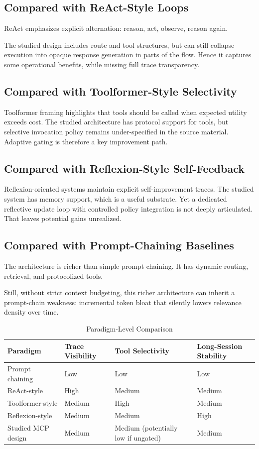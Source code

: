 \documentclass[conference]{IEEEtran}
\begin{document}
\subsection{Compared with ReAct-Style Loops}

ReAct emphasizes explicit alternation:
reason,
act,
observe,
reason again.

The studied design includes route and tool structures,
but can still collapse execution into opaque response generation in parts of the flow.
Hence it captures some operational benefits,
while missing full trace transparency.

\subsection{Compared with Toolformer-Style Selectivity}

Toolformer framing highlights that tools should be called when expected utility exceeds cost.
The studied architecture has protocol support for tools,
but selective invocation policy remains under-specified in the source material.
Adaptive gating is therefore a key improvement path.

\subsection{Compared with Reflexion-Style Self-Feedback}

Reflexion-oriented systems maintain explicit self-improvement traces.
The studied system has memory support,
which is a useful substrate.
Yet a dedicated reflective update loop with controlled policy integration is not deeply articulated.
That leaves potential gains unrealized.

\subsection{Compared with Prompt-Chaining Baselines}

The architecture is richer than simple prompt chaining.
It has dynamic routing,
retrieval,
and protocolized tools.

Still,
without strict context budgeting,
this richer architecture can inherit a prompt-chain weakness:
incremental token bloat that silently lowers relevance density over time.

\begin{table}[H]
\caption{Paradigm-Level Comparison}
\label{tab:paradigm_comparison}
\centering
\begin{tabular}{p{2.1cm}p{1.0cm}p{1.0cm}p{1.0cm}}
\toprule
Paradigm & Trace Visibility & Tool Selectivity & Long-Session Stability \\
\midrule
Prompt chaining & Low & Low & Low \\
ReAct-style & High & Medium & Medium \\
Toolformer-style & Medium & High & Medium \\
Reflexion-style & Medium & Medium & High \\
Studied MCP design & Medium & Medium (potentially low if ungated) & Medium \\
\bottomrule
\end{tabular}
\end{table}
\end{document}
